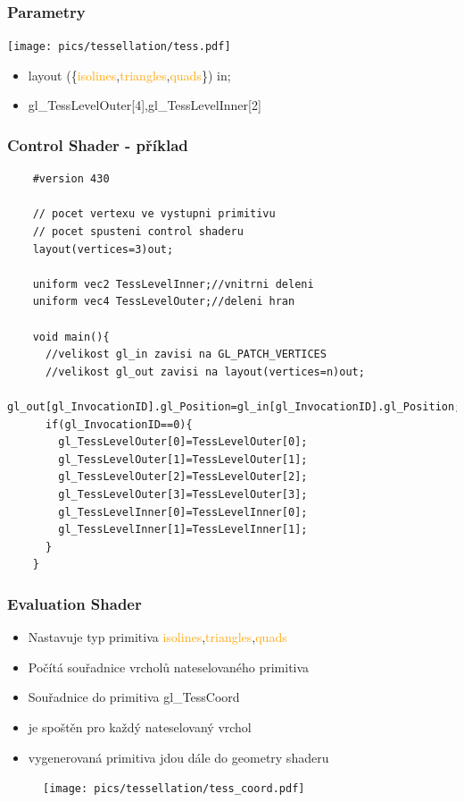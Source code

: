 \begin{frame}
    \frametitle{Parametry}

    \texttt{[image: pics/tessellation/tess.pdf]}

    \begin{itemize}
				\item \textcolor{OliveGreen}{layout}
					(\{\textcolor{orange}{isolines},\textcolor{orange}{triangles},\textcolor{orange}{quads}\})
					\textcolor{OliveGreen}{in};
				\item \textcolor{OliveGreen}{gl\_TessLevelOuter}[4],\textcolor{OliveGreen}{gl\_TessLevelInner}[2]
    \end{itemize}
\end{frame}

\begin{frame}[fragile]
\frametitle{Control Shader - příklad}
	{\scriptsize
	\begin{verbatim}
	#version 430

	// pocet vertexu ve vystupni primitivu
	// pocet spusteni control shaderu
	layout(vertices=3)out;

	uniform vec2 TessLevelInner;//vnitrni deleni
	uniform vec4 TessLevelOuter;//deleni hran

	void main(){
	  //velikost gl_in zavisi na GL_PATCH_VERTICES
	  //velikost gl_out zavisi na layout(vertices=n)out;
	  gl_out[gl_InvocationID].gl_Position=gl_in[gl_InvocationID].gl_Position;
	  if(gl_InvocationID==0){
	    gl_TessLevelOuter[0]=TessLevelOuter[0];
	    gl_TessLevelOuter[1]=TessLevelOuter[1];
	    gl_TessLevelOuter[2]=TessLevelOuter[2];
	    gl_TessLevelOuter[3]=TessLevelOuter[3];
	    gl_TessLevelInner[0]=TessLevelInner[0];
	    gl_TessLevelInner[1]=TessLevelInner[1];
	  }
	}
	\end{verbatim}
	}
\end{frame}

\begin{frame}
\frametitle{Evaluation Shader}
	\begin{itemize}
		\item Nastavuje typ primitiva \textcolor{Orange}{isolines},\textcolor{orange}{triangles},\textcolor{orange}{quads}
		\item Počítá souřadnice vrcholů nateselovaného primitiva
		\item Souřadnice do primitiva \textcolor{OliveGreen}{gl\_TessCoord}
		\item je spoštěn pro každý nateselovaný vrchol
		\item vygenerovaná primitiva jdou dále do geometry shaderu
	\end{itemize}
	\begin{figure}[h]
	\texttt{[image: pics/tessellation/tess\_coord.pdf]}
	\end{figure}
\end{frame}


